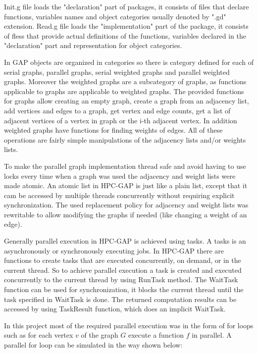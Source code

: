 \documentclass{report}
\theoremstyle{plain}
\theoremstyle{definition}
\theoremstyle{remark}
\begin{document}
Init.g file loads the "declaration" part of packages, it consists of files that declare functions, variables names and object categories usually denoted by ".gd" extension. Read.g file loads the "implementation" part of the package, it consists of fless that provide actual definitions of the functions, variables declared in the "declaration" part and representation for object categories.

In GAP objects are organized in categories so there is category defined for each of serial graphs, parallel graphs, serial weighted graphs and parallel weighted graphs. Moreover the weighted graphs are a subcategory of graphs, as functions applicable to graphs are applicable to weighted graphs. The provided functions for graphs allow creating an empty graph, create a graph from an adjacency list, add vertices and edges to a graph, get vertex and edge counts, get a list of adjacent vertices of a vertex in graph or the i-th adjacent vertex. In addition weighted graphs have functions for finding weights of edges. All of these operations are fairly simple manipulations of the adjacency lists and/or weights lists.

To make the parallel graph implementation thread safe and avoid having to use locks every time when a graph was used the adjacency and weight lists were made atomic. An atomic list in HPC-GAP is just like a plain list, except that it cam be accessed by multiple threads concurrently without requiring explicit synchronization. The used replacement policy for adjacency and weight lists was rewritable to allow modifying the graphs if needed (like changing a weight of an edge).

Generally parallel execution in HPC-GAP is achieved using tasks. A tasks is an asynchronously or synchronously executing jobs. In HPC-GAP there are functions to create tasks that are executed concurrently, on demand, or in the current thread. So to achieve parallel execution a task is created and executed concurrently to the current thread by using RunTask method. The WaitTask function can be used for synchronization, it blocks the current thread until the task specified in WaitTask is done. The returned computation results can be accessed by using TaskResult function, which does an implicit WaitTask.

In this project most of the required parallel execution was in the form of for loops such as for each vertex $v$ of the graph $G$ execute a function $f$ in parallel. A parallel for loop can be simulated in the way shown below:
\end{document}
